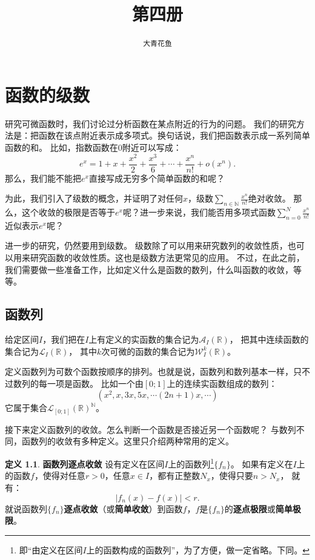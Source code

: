\documentclass[12pt,UTF8]{ctexbook}
\title{\zihao{0} \bfseries 第四册}
\author{\zihao{2} \texttt{大青花鱼}}
\date{}
\newcommand{\olim}[1]{\mathit{o}\left(#1\right)}  %
\theoremstyle{definition}
\newtheorem{df}{定义}[section]
\theoremstyle{plain}
\begin{document}
\maketitle
\tableofcontents
\newpage

\chapter{函数的级数}

研究可微函数时，我们讨论过分析函数在某点附近的行为的问题。
我们的研究方法是：把函数在该点附近表示成多项式。换句话说，我们把函数表示成一系列简单函数的和。
比如，指数函数在$0$附近可以写成：
$$e^x = 1 + x + \frac{x^2}{2} + \frac{x^3}{6} + \cdots + \frac{x^n}{n!} + \olim{x^n}.$$
那么，我们能不能把$e^x$直接写成无穷多个简单函数的和呢？

为此，我们引入了级数的概念，并证明了对任何$x$，级数$\sum_{n\in\mathbb{N}}\frac{x^{n}}{n!}$绝对收敛。
那么，这个收敛的极限是否等于$e^x$呢？进一步来说，我们能否用多项式函数$\sum_{n=0}^N\frac{x^{n}}{n!}$
近似表示$e^x$呢？

进一步的研究，仍然要用到级数。
级数除了可以用来研究数列的收敛性质，也可以用来研究函数的收敛性质。这也是级数方法更常见的应用。
不过，在此之前，我们需要做一些准备工作，比如定义什么是函数的数列，什么叫函数的收敛，等等。

\section{函数列}

给定区间$I$，我们把在$I$上有定义的实函数的集合记为$\mathcal{A}_I(\mathbb{R})$，
把其中连续函数的集合记为$\mathcal{L}_I(\mathbb{R})$，
其中$k$次可微的函数的集合记为$\mathcal{W}_I^k(\mathbb{R})$。

定义函数列为可数个函数按顺序的排列。也就是说，函数列和数列基本一样，只不过数列的每一项是函数。
比如一个由$[0;1]$上的连续实函数组成的数列：
$$ (x^2, x, 3x, 5x, \cdots (2n+1)x, \cdots )$$
它属于集合$\mathcal{L}_{[0;1]}(\mathbb{R})^{\mathbb{N}}$。

接下来定义函数列的收敛。怎么判断一个函数是否接近另一个函数呢？
与数列不同，函数列的收敛有多种定义。这里只介绍两种常用的定义。
\begin{df}{\textbf{函数列逐点收敛}}
    设有定义在区间$I$上的函数列\footnote{即“由定义在区间$I$上的函数构成的函数列”，为了方便，做一定省略。下同。}$\{f_n\}$。
    如果有定义在$I$上的函数$f$，使得对任意$r>0$，任意$x\in I$，都有正整数$N_x$，使得只要$n>N_x$，
    就有：
    $$ |f_n(x) - f(x) | < r.$$
    就说函数列$\{f_n\}$\textbf{逐点收敛}（或\textbf{简单收敛}）到函数$f$，$f$是$\{f_n\}$的\textbf{逐点极限}或\textbf{简单极限}。
\end{df}
\end{document}
